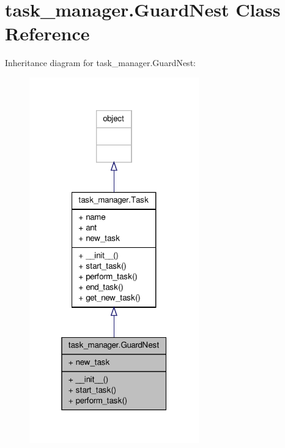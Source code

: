 \hypertarget{classtask__manager_1_1GuardNest}{\section{task\+\_\+manager.\+Guard\+Nest Class Reference}
\label{classtask__manager_1_1GuardNest}
}


Inheritance diagram for task\+\_\+manager.\+Guard\+Nest\+:
\nopagebreak
\begin{figure}[H]
\begin{center}
\leavevmode
\includegraphics[width=208pt]{classtask__manager_1_1GuardNest__inherit__graph}
\end{center}
\end{figure}


